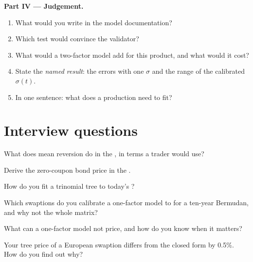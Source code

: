 \begin{problem}
\medskip\noindent\textbf{Part IV --- Judgement.}
\begin{enumerate}[resume]
\item What would you write in the model documentation?
\item Which test would convince the validator?
\item What would a two-factor model add for this product, and what would it cost?
\item State the \emph{named result}: the errors with one $\sigma$ and the range of the
calibrated $\sigma(t)$.
\item In one sentence: what does a production  need to fit?
\end{enumerate}
\end{problem}

\section{Interview questions}

\begin{interviewq}\label{iq:rc:short-rate-models:1}
What does mean reversion do in the , in terms a trader would
use?
\end{interviewq}

\begin{interviewq}\label{iq:rc:short-rate-models:2}
Derive the zero-coupon bond price in the .
\end{interviewq}

\begin{interviewq}\label{iq:rc:short-rate-models:3}
How do you fit a trinomial tree to today's ?
\end{interviewq}

\begin{interviewq}\label{iq:rc:short-rate-models:4}
Which swaptions do you calibrate a one-factor model to for a ten-year Bermudan,
and why not the whole matrix?
\end{interviewq}

\begin{interviewq}\label{iq:rc:short-rate-models:5}
What can a one-factor model not price, and how do you know when it matters?
\end{interviewq}

\begin{interviewq}\label{iq:rc:short-rate-models:6}
Your tree price of a European swaption differs from the closed form by 0.5\%.
How do you find out why?
\end{interviewq}
